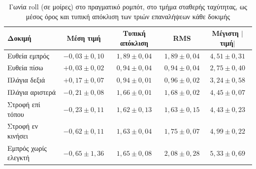 \documentclass[11pt]{report}
\begin{document}
\begin{table}[htbp]
    \centering
    \small
    \begin{tabular}{@{}l c c c c@{}}
        \toprule
        Δοκιμή & Μέση τιμή & Τυπική απόκλιση & RMS & Μέγιστη $|$τιμή$|$ \\
        \midrule
        Ευθεία εμπρός & $-0{,}03 \pm 0{,}10$ & $1{,}89 \pm 0{,}04$ & $1{,}89 \pm 0{,}04$ & $4{,}51 \pm 0{,}31$ \\
        Ευθεία πίσω & $+0{,}03 \pm 0{,}02$ & $0{,}94 \pm 0{,}04$ & $0{,}94 \pm 0{,}04$ & $2{,}75 \pm 0{,}40$ \\
        Πλάγια δεξιά & $+0{,}17 \pm 0{,}07$ & $0{,}94 \pm 0{,}01$ & $0{,}96 \pm 0{,}02$ & $3{,}24 \pm 0{,}58$ \\
        Πλάγια αριστερά & $-0{,}21 \pm 0{,}08$ & $1{,}66 \pm 0{,}01$ & $1{,}68 \pm 0{,}02$ & $4{,}45 \pm 0{,}07$ \\
        Στροφή επί τόπου & $-0{,}23 \pm 0{,}11$ & $1{,}62 \pm 0{,}13$ & $1{,}63 \pm 0{,}15$ & $4{,}43 \pm 0{,}23$ \\
        Στροφή εν κινήσει & $-0{,}62 \pm 0{,}11$ & $1{,}63 \pm 0{,}04$ & $1{,}75 \pm 0{,}07$ & $4{,}99 \pm 0{,}22$ \\
        Εμπρός χωρίς ελεγκτή & $-0{,}65 \pm 1{,}36$ & $1{,}65 \pm 0{,}08$ & $2{,}08 \pm 0{,}28$ & $5{,}33 \pm 0{,}69$ \\
        \bottomrule
    \end{tabular}
    \caption[Γωνία roll στο πραγματικό ρομπότ]{Γωνία roll (σε μοίρες) στο
    πραγματικό ρομπότ, στο τμήμα σταθερής ταχύτητας, ως μέσος όρος και τυπική
    απόκλιση των τριών επαναλήψεων κάθε δοκιμής}
    \label{tab:final-roll}
\end{table}
\end{document}
